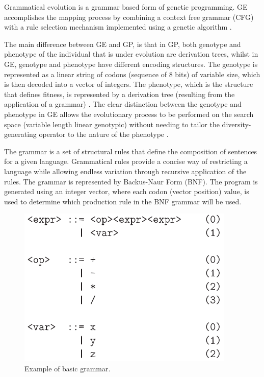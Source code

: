 \documentclass[journal]{IEEEtran}
\begin{document}
Grammatical evolution is a grammar based form of genetic programming. GE accomplishes the mapping process by combining a context free grammar (CFG) with a rule selection mechanism implemented using a genetic algorithm \cite{byrne2015optimising}.

The main difference between GE and GP, is that in GP, both genotype and phenotype of the individual that is under evolution are derivation trees, whilst in GE, genotype and phenotype have different encoding structures. The genotype is represented as a linear string of codons (sequence of 8 bits) of variable size, which is then decoded into a vector of integers. The phenotype, which is the structure that defines fitness, is represented by a derivation tree (resulting from the application of a grammar) \cite{cerri2013grammatical}. The clear distinction between the genotype and phenotype in GE allows the evolutionary process to be performed on the search space (variable length linear genotypic) without needing to tailor the diversity-generating operator to the nature of the phenotype \cite{sabar2013grammatical}.

The grammar is a set of structural rules that define the composition of sentences for a given language. Grammatical rules provide a concise way of restricting a language while allowing endless variation through recursive application of the rules\cite{byrne2015optimising}. The grammar is represented by Backus-Naur Form (BNF). The program is generated using an integer vector, where each codon (vector position) value, is used to determine which production rule in the BNF grammar will be used.

\begin{figure}[!htb]
	\centering
	\includegraphics[scale=.6]{figures/grammar.png}
	\caption{Example of basic grammar. \cite{ryan1998grammatical}}
	\label{fig:grammar}
\end{figure}
\end{document}
